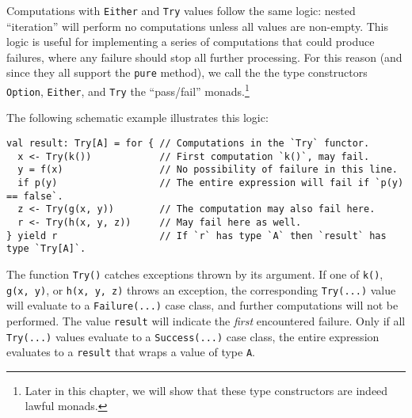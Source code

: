 Computations with \lstinline!Either! and \lstinline!Try! values
follow the same logic: nested \textsf{``}iteration\textsf{''} will perform no computations
unless all values are non-empty. This logic is useful for implementing
a series of computations that could produce failures, where any failure
should stop all further processing. For this reason (and since they
all support the \lstinline!pure! method), we call the the type constructors
\lstinline!Option!, \lstinline!Either!, and \lstinline!Try! the
\textsf{``}pass/fail\textsf{''} monads.\footnote{Later in this chapter, we will show that these type constructors are
indeed lawful monads.}

The following schematic example illustrates this logic:
\begin{lstlisting}
val result: Try[A] = for { // Computations in the `Try` functor.
  x <- Try(k())            // First computation `k()`, may fail.
  y = f(x)                 // No possibility of failure in this line.
  if p(y)                  // The entire expression will fail if `p(y) == false`.
  z <- Try(g(x, y))        // The computation may also fail here.
  r <- Try(h(x, y, z))     // May fail here as well.
} yield r                  // If `r` has type `A` then `result` has type `Try[A]`.
\end{lstlisting}
The function \lstinline!Try()! catches exceptions thrown by its argument.
If one of \lstinline!k()!, \lstinline!g(x, y)!, or \lstinline!h(x, y, z)!
throws an exception, the corresponding \lstinline!Try(...)! value
will evaluate to a \lstinline!Failure(...)! case class, and further
computations will not be performed. The value \lstinline!result!
will indicate the \emph{first} encountered failure. Only if all \lstinline!Try(...)!
values evaluate to a \lstinline!Success(...)! case class, the entire
expression evaluates to a \lstinline!result! that wraps a value of
type \lstinline!A!.

